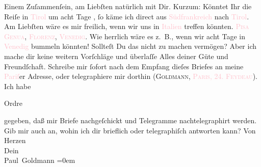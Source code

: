                Einem Zuſammenſein, am Liebſten natürlich mit Dir.\pend
           \pstart
           Kurzum: Könntet Ihr die Reiſe in \textcolor{pink}{Tirol}{}\ledrightnote{\textcolor{pink}{Tirol}{\newline}\textcolor{pink}{Südtirol}} um acht
               Tage \label{K_L02610-1v}\label{K_L02610-1h}, ſo käme ich direct aus \textcolor{pink}{Südfrankreich}{}\ledrightnote{\textcolor{pink}{Frankreich}} nach \textcolor{pink}{Tirol}{}\ledrightnote{\textcolor{pink}{Tirol}{\newline}\textcolor{pink}{Südtirol}}.
               Am Liebſten wäre es mir freilich, wenn wir uns in \textcolor{pink}{Italien}{}\ledrightnote{\textcolor{pink}{Italien}} treffen könnten. \textsc{\textcolor{pink}{Pisa}{}\ledrightnote{\textcolor{pink}{Pisa}}}{ }\textsc{\textcolor{pink}{Genua}{}\ledrightnote{\textcolor{pink}{Genua}}}, \textsc{\textcolor{pink}{Florenz}{}\ledrightnote{\textcolor{pink}{Florenz}}}, \textsc{\textcolor{pink}{Venedig}{}\ledrightnote{\textcolor{pink}{Venedig}}}. Wie herrlich wäre
               es z. B., wenn wir acht Tage in \textcolor{pink}{Venedig}{}\ledrightnote{\textcolor{pink}{Venedig}}{ } bummeln könnten! Sollteſt Du das nicht zu {\pb}machen vermögen? Aber ich mache dir keine weitern
               Vorſchläge und überlaſſe Alles deiner Güte und Freundſchaft.\pend
           \pstart
           Schreibe mir ſofort nach dem Empfang dieſes Briefes an meine \textcolor{pink}{Pariſ}{}\ledrightnote{\textcolor{pink}{Paris}}er Adresse, oder telegraphiere mir dorthin (\textsc{Goldmann}, \textsc{\textcolor{pink}{Paris, 24. Feydeau}{}\ledrightnote{\textcolor{pink}{rue Feydeau}}}). Ich habe \begin{otherlanguage}{french}Ordre\end{otherlanguage} gegeben, daß mir Briefe nachgeſchickt und Telegramme
               nachtelegraphirt werden. Gib mir auch an, wohin ich dir brieflich oder telegraphiſch
               antworten kann?\pend
           \pstart
           Von Herzen{\\[\baselineskip]} Dein{\\[\baselineskip]}\spacefill\mbox{Paul Goldmann}\pend
           \leftskip=0em{}\pstart
           \noindent{}{\pb}\label{T_L02610-1v}\label{T_L02610-1h}\pend
           \endnumbering{}  
      